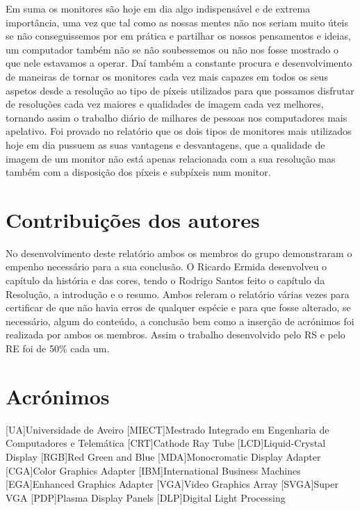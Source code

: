 \documentclass[a4paper]{report}
\begin{document}
Em suma os monitores são hoje em dia algo indispensável e de extrema importância, uma vez que tal como as nossas mentes não nos seriam muito úteis se não conseguissemos por em prática e partilhar os nossos pensamentos e ideias, um computador também não se não soubessemos ou não nos fosse mostrado o que nele estavamos a operar. Daí também a constante procura e desenvolvimento de maneiras de tornar os monitores cada vez mais capazes em todos os seus aspetos desde a resolução ao tipo de píxeis utilizados para que possamos disfrutar de resoluções cada vez maiores e qualidades de imagem cada vez melhores, tornando assim o trabalho diário de milhares de pessoas nos computadores mais apelativo.
Foi provado no relatório que os dois tipos de monitores mais utilizados hoje em dia pussuem as suas vantagens e desvantagens, que a qualidade de imagem de um monitor não está apenas relacionada com a sua resolução mas também com a disposição dos píxeis e subpíxeis num monitor.

\chapter*{Contribuições dos autores}

No desenvolvimento deste relatório ambos os membros do grupo demonstraram o empenho necessário para a sua conclusão.
O Ricardo Ermida desenvolveu o capítulo da história e das cores, tendo o Rodrigo Santos feito o capítulo da Resolução, a introdução e o resumo. Ambos releram o relatório várias vezes para certificar de que não havia erros de qualquer espécie e para que fosse alterado, se necessário, algum do conteúdo, a conclusão bem como a inserção de acrónimos foi realizada por ambos os membros.
Assim o trabalho desenvolvido pelo RS e pelo RE foi de 50\% cada um.


\chapter*{Acrónimos}
\begin{acronym}
[UA]{Universidade de Aveiro}
[MIECT]{Mestrado Integrado em Engenharia de Computadores e Telemática}
[CRT]{Cathode Ray Tube}
[LCD]{Liquid-Crystal Display}
[RGB]{Red Green and Blue}
[MDA]{Monocromatic Display Adapter}
[CGA]{Color Graphics Adapter}
[IBM]{International Business Machines}
[EGA]{Enhanced Graphics Adapter}
[VGA]{Video Graphics Array}
[SVGA]{Super VGA}
[PDP]{Plasma Display Panels}
[DLP]{Digital Light Processing}
\end{acronym}
\end{document}
